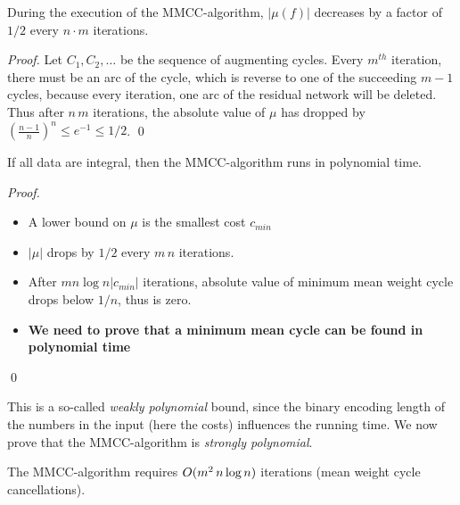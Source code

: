   \begin{corollary}
    \label{co:4}
    During the execution of the MMCC-algorithm, $|\mu(f)|$ decreases by
    a factor of $1/2$ every $n\cdot m$ iterations. 
  \end{corollary}

  \begin{proof}
    Let $C_1, C_2,\ldots$ be the sequence of augmenting cycles. Every
    $m^{th}$ iteration, there must be an arc of the cycle, which is
    reverse to one of the succeeding $m-1$ cycles, because every
    iteration, one arc of the residual network will be deleted. 
    Thus after $n \, m$ iterations, the absolute value of $\mu$ has
    dropped by $\left(\frac{n-1}{n} \right)^n \leq e^{-1} \leq 1/2$.  \qed
  \end{proof}

  \begin{corollary}
    \label{co:5}
    If all data are integral, then the
    MMCC-algorithm runs in polynomial time. 
  \end{corollary}
  
  \begin{proof}
    \begin{itemize}
    \item A lower bound on $\mu$ is the smallest cost $c_{min}$
    \item $|\mu|$ drops by $1/2$ every $m \, n$ iterations. 
    \item After $m n \log n |c_{min}|$ iterations, absolute value
    of minimum mean weight cycle   drops below $1/n$, thus is zero.
    \item {\bf We need to prove that a minimum mean cycle can be found        in polynomial time} 
    \end{itemize} \qed
  \end{proof}


This is a so-called \emph{weakly polynomial} bound, since the binary
encoding length of the numbers in the input (here the costs)
influences the running time. We now prove that the MMCC-algorithm is
\emph{strongly polynomial}. 






\begin{theorem}
  The MMCC-algorithm requires  $O(m^2 \, n \log n)$ iterations
  (mean weight cycle cancellations). 
\end{theorem}

